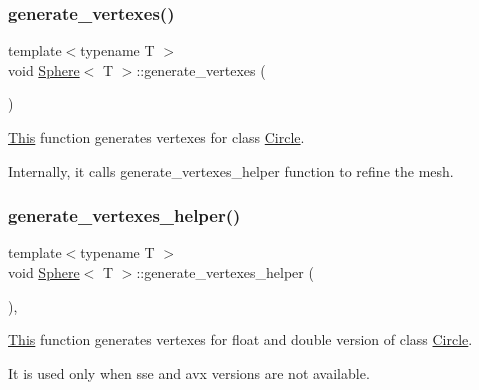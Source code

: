 \subsubsection{\texorpdfstring{generate\+\_\+vertexes()}{generate\_vertexes()}}
{\footnotesize\ttfamily template$<$typename T $>$ \\
void \mbox{\hyperlink{classSphere}{Sphere}}$<$ T $>$\+::generate\+\_\+vertexes (\begin{DoxyParamCaption}{ }\end{DoxyParamCaption})\hspace{0.3cm}{\ttfamily [private]}}



\mbox{\hyperlink{classThis}{This}} function generates vertexes for class \mbox{\hyperlink{classCircle}{Circle}}. 

Internally, it calls generate\+\_\+vertexes\+\_\+helper function to refine the mesh. \mbox{\label{classSphere_a84a45f41ca9e630beb97fc106b359ffd}} 
\subsubsection{\texorpdfstring{generate\+\_\+vertexes\+\_\+helper()}{generate\_vertexes\_helper()}}
{\footnotesize\ttfamily template$<$typename T $>$ \\
void \mbox{\hyperlink{classSphere}{Sphere}}$<$ T $>$\+::generate\+\_\+vertexes\+\_\+helper (\begin{DoxyParamCaption}{ }\end{DoxyParamCaption})\hspace{0.3cm}{\ttfamily [inline]}, {\ttfamily [private]}}



\mbox{\hyperlink{classThis}{This}} function generates vertexes for float and double version of class \mbox{\hyperlink{classCircle}{Circle}}. 

It is used only when sse and avx versions are not available. \mbox{\label{classSphere_ab739ad1931e58a4ba7c84e3ca5c1965d}} 
